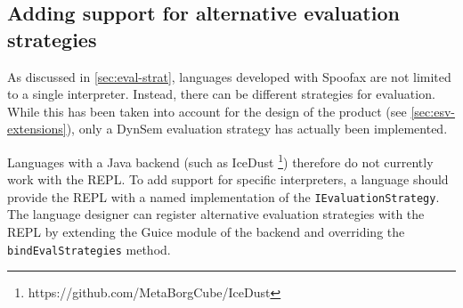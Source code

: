 \subsection{Adding support for alternative evaluation strategies}
\label{ssec:discuss-alternate-eval}

As discussed in \cref{sec:eval-strat}, languages developed with Spoofax are not
limited to a single interpreter. Instead, there can be different strategies for
evaluation. While this has been taken into account for the design of the
product (see \cref{sec:esv-extensions}), only a DynSem evaluation strategy has
actually been implemented.

Languages with a Java backend (such as IceDust%
\footnote{https://github.com/MetaBorgCube/IceDust}) therefore do not currently
work with the REPL. To add support for specific interpreters, a language should
provide the REPL with a named implementation of the
\texttt{IEvaluationStrategy}. The language designer can register alternative
evaluation strategies with the REPL by extending the Guice module of the backend
and overriding the \texttt{bindEvalStrategies} method.
